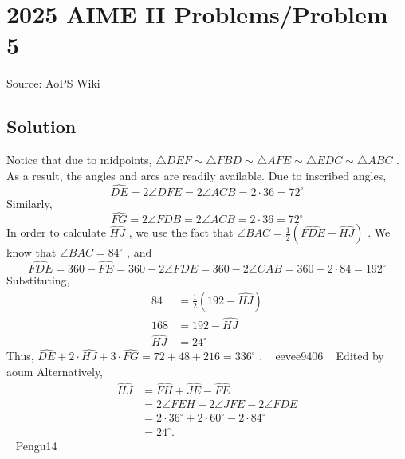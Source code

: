 \documentclass[12pt]{article}
\begin{document}
\section*{{2025 AIME II Problems/Problem 5}}
Source: AoPS Wiki

\subsection*{Solution}
Notice that due to midpoints, $\triangle DEF\sim\triangle FBD\sim\triangle AFE\sim\triangle EDC\sim\triangle ABC$ . As a result, the angles and arcs are readily available. Due to inscribed angles, \[\widehat{DE}=2\angle DFE=2\angle ACB=2\cdot36=72^\circ\] Similarly, \[\widehat{FG}=2\angle FDB=2\angle ACB=2\cdot36=72^\circ\] In order to calculate $\widehat{HJ}$ , we use the fact that $\angle BAC=\frac{1}{2}(\widehat{FDE}-\widehat{HJ})$ . We know that $\angle BAC=84^\circ$ , and \[\widehat{FDE}=360-\widehat{FE}=360-2\angle FDE=360-2\angle CAB=360-2\cdot84=192^\circ\] Substituting, \begin{align*}
84 &= \frac{1}{2}(192-\widehat{HJ}) \\
168 &= 192-\widehat{HJ} \\
\widehat{HJ} &= 24^\circ
\end{align*} Thus, $\widehat{DE}+2\cdot\widehat{HJ}+3\cdot\widehat{FG}=72+48+216=\boxed{336}^\circ$ . ~ eevee9406 ~ Edited by aoum Alternatively, \begin{align*} \widehat{HJ} &= \widehat{FH} + \widehat{JE} - \widehat{FE} \\ &= 2\angle FEH + 2\angle JFE - 2\angle FDE \\ &= 2 \cdot 36^\circ + 2 \cdot 60^\circ - 2 \cdot 84^\circ \\ &= 24^\circ. \end{align*} ~ Pengu14
\end{document}
